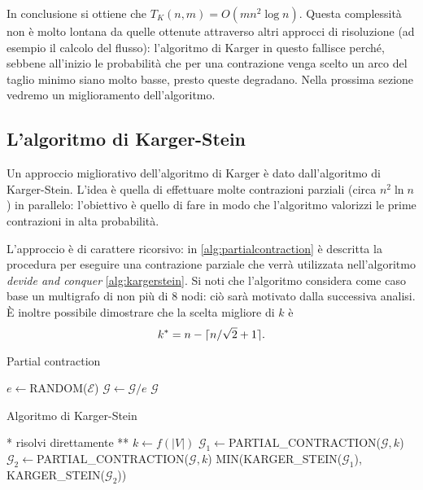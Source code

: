 In conclusione si ottiene che $T_K(n,m)=O(mn^2\log n)$. Questa complessità non è molto lontana da quelle ottenute attraverso altri approcci di risoluzione (ad esempio il calcolo del flusso): l'algoritmo di Karger in questo fallisce perché, sebbene all'inizio le probabilità che per una contrazione venga scelto un arco del taglio minimo siano molto basse, presto queste degradano. Nella prossima sezione vedremo un miglioramento dell'algoritmo.

\subsection{L'algoritmo di Karger-Stein}
Un approccio migliorativo dell'algoritmo di Karger è dato dall'algoritmo di Karger-Stein. L'idea è quella di effettuare molte contrazioni parziali (circa $n^2\ln n$) in parallelo: l'obiettivo è quello di fare in modo che l'algoritmo valorizzi le prime contrazioni in alta probabilità.

L'approccio è di carattere ricorsivo: in \ref{alg:partialcontraction} è descritta la procedura per eseguire una contrazione parziale che verrà utilizzata nell'algoritmo \textit{devide and conquer} \ref{alg:kargerstein}. Si noti che l'algoritmo considera come caso base un multigrafo di non più di 8 nodi: ciò sarà motivato dalla successiva analisi. È inoltre possibile dimostrare che la scelta migliore di $k$ è
\[
k^*=n-\lceil n/\sqrt{2}+1\rceil.
\]

\begin{algorithm}
\caption{Partial contraction}
\label{alg:partialcontraction}
\begin{algorithmic}
		\State $e \gets$RANDOM($\mathcal{E}$)
		\State $\mathcal{G} \gets \mathcal{G}/e$
	\EndFor
	\State \Return $\mathcal{G}$
\EndFunction
\end{algorithmic}
\end{algorithm}

\begin{algorithm}
\caption{Algoritmo di Karger-Stein}
\label{alg:kargerstein}
\begin{algorithmic}
		\State ** risolvi direttamente **
	\EndIf
	\State $k\gets f(|V|)$
	\State $\mathcal{G}_1\gets $PARTIAL\_CONTRACTION($\mathcal{G},k$)
	\State $\mathcal{G}_2\gets $PARTIAL\_CONTRACTION($\mathcal{G},k$)
	\State \Return MIN(KARGER\_STEIN($\mathcal{G}_1$), KARGER\_STEIN($\mathcal{G}_2$))
\EndFunction
\end{algorithmic}
\end{algorithm}

